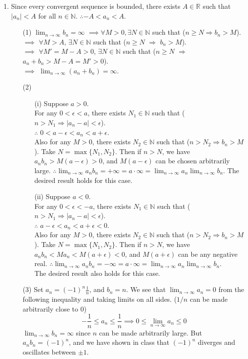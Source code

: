 \documentclass[12pt]{report}
\newcommand{\numl}[1]{\item[\large\textbf{\sffamily #1.}]}
\newcommand{\bb}[1]{\mathbb{#1}}
\newcommand{\abs}[1]{\left|#1\right|}
\newcommand{\ds}{\displaystyle}
\begin{document}
\begin{enumerate}
\numl{2} Since every convergent sequence is bounded, there exists $A\in \bb{R}$ such that $\abs{a_n} < A$ for all $n\in \bb{N}$.  $\therefore -A < a_n < A$.
\begin{enumerate}
	\item[(1)] $\ds \lim_{n\rightarrow \infty} b_n = \infty$ $\implies \forall M>0, \exists N\in \bb{N}$ such that ($n \geq N \Rightarrow b_n > M$).\\
	$\implies$ $\forall M > A$, $\exists N\in \bb{N}$ such that ($n\geq N$ $\Rightarrow$ $b_n>M$).\\
	$\implies$ $\forall M' = M - A > 0$, $\exists N \in \bb{N}$ such that ($n \geq N$ $\Rightarrow$ $a_n+b_n > M - A = M' > 0$).\\
	$\implies$ $\ds \lim_{n\rightarrow \infty} (a_n+b_n) =\infty$.
	\item[(2)]
	\begin{enumerate}
		\item[(i)] Suppose $a > 0$. \\For any $0 < \epsilon < a$, there exists $N_1 \in \bb{N}$ such that ($n > N_1 \Rightarrow \abs{a_n-a} < \epsilon$).\\
		$\therefore$ $0 < a - \epsilon < a_n < a + \epsilon$.\\
		Also for any $M > 0$, there exists $N_2\in\bb{N}$ such that ($n > N_2 \Rightarrow b_n > M$). Take $N = \max\{N_1, N_2\}$. Then if $n > N$, we have $a_nb_n > M(a-\epsilon) > 0$, and $M(a-\epsilon)$ can be chosen arbitrarily large. $\therefore \ds \lim_{n\rightarrow \infty} a_nb_n = +\infty = a \cdot \infty = \lim_{n\rightarrow \infty} a_n \lim_{n\rightarrow \infty} b_n$. The desired result holds for this case.
		\item[(ii)]	Suppose $a < 0$.\\For any $0 < \epsilon < -a$, there exists $N_1 \in \bb{N}$ such that ($n > N_1 \Rightarrow \abs{a_n-a} < \epsilon$).\\
		$\therefore$ $a - \epsilon < a_n < a + \epsilon < 0$.\\
		Also for any $M > 0$, there exists $N_2\in\bb{N}$ such that ($n > N_2 \Rightarrow b_n > M$). Take $N = \max\{N_1, N_2\}$. Then if $n > N$, we have $a_nb_n < Ma_n < M(a+\epsilon) < 0$, and $M(a+\epsilon)$ can be any negative real. $\therefore \ds \lim_{n\rightarrow \infty} a_nb_n = -\infty = a \cdot \infty = \lim_{n\rightarrow \infty} a_n \lim_{n\rightarrow \infty} b_n$. \\The desired result also holds for this case.
	\end{enumerate}
	\item[(3)] Set $a_n = \ds (-1)^n\frac{1}{n}$, and $b_n = n$. We see that $\ds \lim_{n\rightarrow \infty} a_n = 0$ from the following inequality and taking limits on all sides. ($1/n$ can be made arbitrarily close to 0)$$-\frac{1}{n} \leq a_n \leq \frac{1}{n} \implies 0 \leq \lim_{n\rightarrow \infty} a_n \leq 0$$
	$\ds\lim_{n\rightarrow \infty}b_n = \infty$ since $n$ can be made arbitrarily large. But $a_nb_n = (-1)^n$, and we have shown in class that $(-1)^n$ diverges and oscillates between $\pm 1$.
\end{enumerate}


\end{enumerate}
\end{document}
